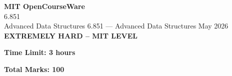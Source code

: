 \documentclass[12pt,a4paper]{exam}
\begin{document}
\begin{center}
{\LARGE \textbf{MIT OpenCourseWare}}\\6.851\\Advanced Data Structures
\vspace{0.5cm}
{6.851} --- {Advanced Data Structures}
\vspace{0.3cm}
May 2026
\vspace{0.3cm}
\textbf{EXTREMELY HARD -- MIT LEVEL}
\end{center}

\begin{center}
\textbf{Time Limit: 3 hours}
\end{center}

\begin{center}
\textbf{Total Marks: 100}
\end{center}

\vspace{0.5cm}
\end{document}
